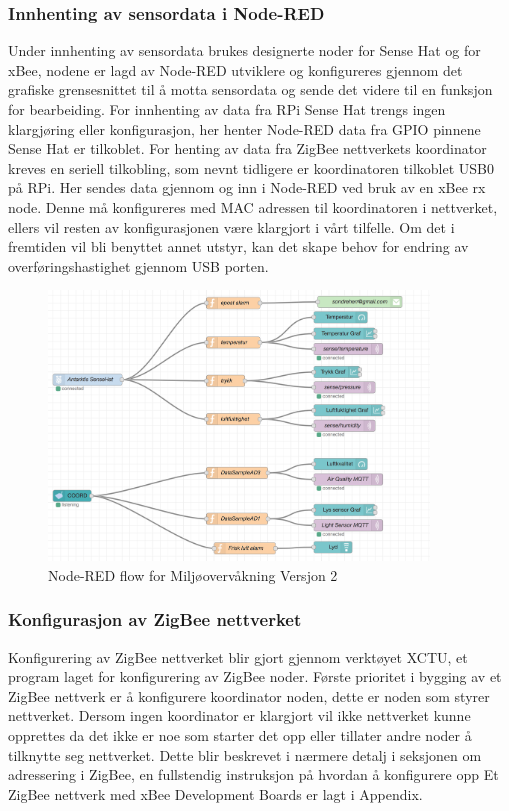 \documentclass{article}
\begin{document}
\subsubsection{Innhenting av sensordata i Node-RED}

Under innhenting av sensordata brukes designerte noder for Sense Hat og for xBee, nodene er lagd av Node-RED utviklere og konfigureres gjennom det grafiske grensesnittet til å motta sensordata og sende det videre til en funksjon for bearbeiding. For innhenting av data fra RPi Sense Hat trengs ingen klargjøring eller konfigurasjon, her henter Node-RED data fra GPIO pinnene Sense Hat er tilkoblet. For henting av data fra ZigBee nettverkets koordinator kreves en seriell tilkobling, som nevnt tidligere er koordinatoren tilkoblet USB0 på RPi. Her sendes data gjennom og inn i Node-RED ved bruk av en xBee rx node. Denne må konfigureres med MAC adressen til koordinatoren i nettverket, ellers vil resten av konfigurasjonen være klargjort i vårt tilfelle. Om det i fremtiden vil bli benyttet annet utstyr, kan det skape behov for endring av overføringshastighet gjennom USB porten.

\begin{figure}[!ht]
  \centering
      \includegraphics[width=0.9\textwidth]{Dashboard}
  \caption{Node-RED flow for Miljøovervåkning Versjon 2}
\end{figure}


\subsubsection{Konfigurasjon av ZigBee nettverket}
Konfigurering av ZigBee nettverket blir gjort gjennom verktøyet XCTU, et program laget for konfigurering av ZigBee noder. Første prioritet i bygging av et ZigBee nettverk er å konfigurere koordinator noden, dette er noden som styrer nettverket. Dersom ingen koordinator er klargjort vil ikke nettverket kunne opprettes da det ikke er noe som starter det opp eller tillater andre noder å tilknytte seg nettverket. Dette blir beskrevet i nærmere detalj i seksjonen om adressering i ZigBee, en fullstendig instruksjon på hvordan å konfigurere opp Et ZigBee nettverk med xBee Development Boards er lagt i Appendix. 
\end{document}
